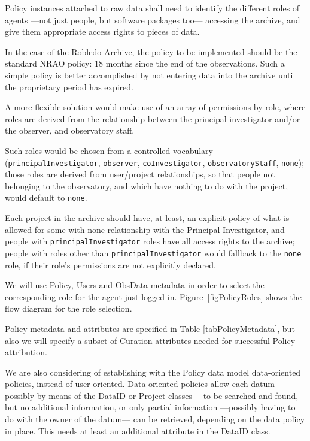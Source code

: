 		Policy instances attached to raw data shall need to
		identify the different roles of agents ---not just people,
		but software packages too--- accessing the archive, and give
		them appropriate access rights to pieces of data.
		
		 In the case of the Robledo Archive, the policy to be
		implemented should be the standard NRAO policy: 18 months
		since the end of the observations. Such a simple policy is
		better accomplished by not entering data into the archive
		until the proprietary period has expired.
		
		 A more flexible solution would make use of an array of
		permissions by role, where roles are derived from the
		relationship between the principal investigator and/or the
		observer, and observatory staff.
		
		 Such roles would be chosen from a controlled vocabulary
		(\texttt{prin\-ci\-pal\-In\-ves\-ti\-ga\-tor},
		\texttt{observer}, \texttt{co\-Inves\-tiga\-tor},
		\texttt{observatory\-Staff}, \texttt{none}); those roles
		are derived from user/project relationships, so that people
		not belonging to the observatory, and which have nothing to
		do with the project, would default to \texttt{none}.
		
		 Each project in the archive should have, at least, an
		explicit policy of what is allowed for some with none
		relationship with the Principal Investigator, and people
		with \texttt{prin\-ci\-pal\-In\-ves\-ti\-ga\-tor} roles
		have all access rights to the archive; people with roles
		other than \texttt{prin\-ci\-pal\-In\-ves\-ti\-ga\-tor}
		would fallback to the \texttt{none} role, if their role’s
		permissions are not explicitly declared.
		
		We will use Policy, Users and ObsData metadata in order to
		select the corresponding role for the agent just logged in.
		Figure~\ref{figPolicyRoles} shows the flow diagram for the
		role selection.
		
 		Policy metadata and attributes are specified in Table
		\ref{tabPolicyMetadata}, but also we will specify a subset
		of Curation attributes needed for successful Policy
		attribution.
		
		 We are also considering of establishing with the Policy
		data model data-oriented policies, instead of
		user-oriented. Data-oriented policies allow each
		datum ---possibly by means of the DataID or Project
		classes---
		to be searched and found, but no additional information, or
		only partial information —possibly having to do with the
		owner of the datum— can be retrieved, depending on the data
		policy in place. This needs at least an additional
		attribute in the DataID class.
		
